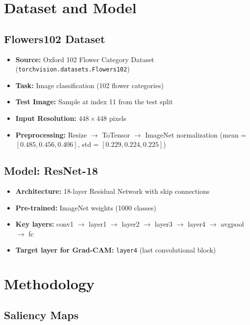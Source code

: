 \documentclass[12pt,a4paper]{article}
\begin{document}
\section{Dataset and Model}

\subsection{Flowers102 Dataset}
\begin{itemize}
    \item \textbf{Source:} Oxford 102 Flower Category Dataset (\texttt{torchvision.datasets.Flowers102})
    \item \textbf{Task:} Image classification (102 flower categories)
    \item \textbf{Test Image:} Sample at index 11 from the test split
    \item \textbf{Input Resolution:} $448 \times 448$ pixels
    \item \textbf{Preprocessing:} Resize $\rightarrow$ ToTensor $\rightarrow$ ImageNet normalization (mean = $[0.485, 0.456, 0.406]$, std = $[0.229, 0.224, 0.225]$)
\end{itemize}

\subsection{Model: ResNet-18}
\begin{itemize}
    \item \textbf{Architecture:} 18-layer Residual Network with skip connections
    \item \textbf{Pre-trained:} ImageNet weights (1000 classes)
    \item \textbf{Key layers:} conv1 $\rightarrow$ layer1 $\rightarrow$ layer2 $\rightarrow$ layer3 $\rightarrow$ layer4 $\rightarrow$ avgpool $\rightarrow$ fc
    \item \textbf{Target layer for Grad-CAM:} \texttt{layer4} (last convolutional block)
\end{itemize}

\section{Methodology}

\subsection{Saliency Maps}
\end{document}
